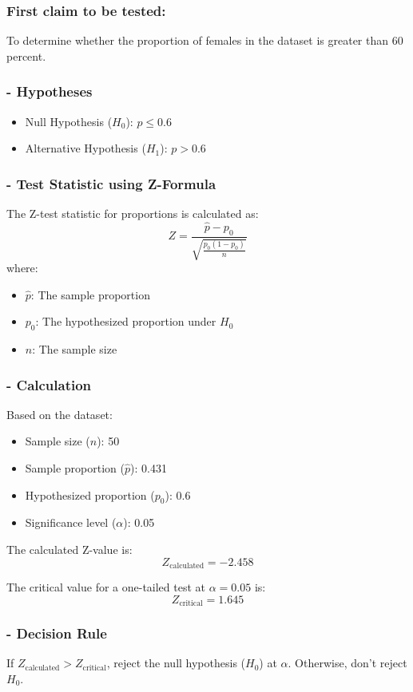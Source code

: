\documentclass[12pt,a4paper]{article}
\begin{document}
\subsubsection*{First claim to be tested: }
To determine whether the proportion of females in the dataset is greater than 60 percent.

\subsubsection*{- Hypotheses}
\begin{itemize}
    \item Null Hypothesis ($H_0$): $p \leq 0.6$
    \item Alternative Hypothesis ($H_1$): $p > 0.6$
\end{itemize}
\vspace{1em}
\subsubsection*{- Test Statistic using Z-Formula}
The Z-test statistic for proportions is calculated as:
\[
Z = \frac{\hat{p} - p_0}{\sqrt{\frac{p_0(1 - p_0)}{n}}}
\]
where:
\begin{itemize}
    \item $\hat{p}$: The sample proportion
    \item $p_0$: The hypothesized proportion under $H_0$
    \item $n$: The sample size
\end{itemize}
\vspace{1em}
\subsubsection*{- Calculation}
Based on the dataset:
\begin{itemize}
    \item Sample size ($n$): 50
    \item Sample proportion ($\hat{p}$): 0.431
    \item Hypothesized proportion ($p_0$): 0.6
    \item Significance level ($\alpha$): 0.05
\end{itemize}

The calculated Z-value is:
\[
Z_{\text{calculated}} = -2.458
\]

The critical value for a one-tailed test at $\alpha = 0.05$ is:
\[
Z_{\text{critical}} = 1.645
\]
\newpage
\vspace{1em}
\subsubsection*{- Decision Rule}
If $Z_{\text{calculated}} > Z_{\text{critical}}$, reject the null hypothesis ($H_0$) at $\alpha$.  Otherwise, don't reject $H_0$.
\end{document}
